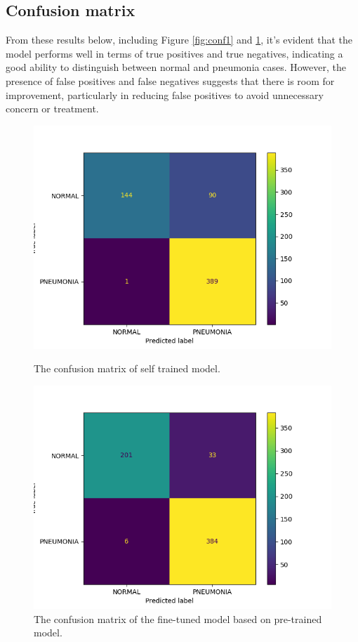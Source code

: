 \documentclass{article}
\begin{document}
\subsection{Confusion matrix}

From these results below, including Figure \ref{fig:conf1} and \ref{fig:conf2}, it's evident that the model performs well in terms of true positives and true negatives, indicating a good ability to distinguish between normal and pneumonia cases. However, the presence of false positives and false negatives suggests that there is room for improvement, particularly in reducing false positives to avoid unnecessary concern or treatment.

\begin{figure}[!htb]
  \begin{minipage}[t]{0.45\textwidth}
    \centering
    \includegraphics[width=\linewidth]{./results_train/confusion_matrix.png}
  \caption{The confusion matrix of self trained model.}
  \label{fig:conf1}
  \end{minipage}
  \hfill
  \begin{minipage}[t]{0.45\textwidth}
    \centering
    \includegraphics[width=\textwidth]{./results/image/confusion_matrix.png}
  \caption{The confusion matrix of the fine-tuned model based on pre-trained model.}
  \label{fig:conf2}
  \end{minipage}
\end{figure}
\end{document}
